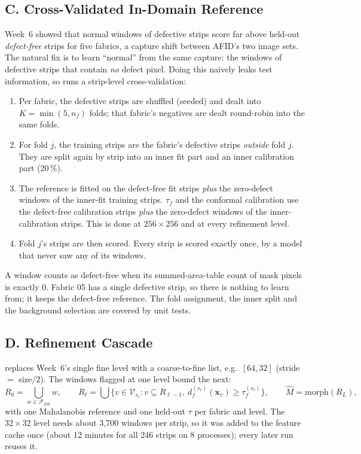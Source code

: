 \documentclass[11pt,a4paper]{article}
\newcommand{\code}[1]{\texttt{\detokenize{#1}}}
\begin{document}
\subsection*{C. Cross-Validated In-Domain Reference}

Week~6 showed that normal windows of defective strips score far above held-out \emph{defect-free} strips for five fabrics, a capture shift between AFID's two image sets. The natural fix is to learn ``normal'' from the same capture: the windows of defective strips that contain \emph{no} defect pixel. Doing this naively leaks test information, so \code{model.reference = "in_domain"} runs a strip-level cross-validation:
\begin{enumerate}
  \item Per fabric, the defective strips are shuffled (seeded) and dealt into $K=\min(5,n_f)$ folds; that fabric's negatives are dealt round-robin into the same folds.
  \item For fold $j$, the training strips are the fabric's defective strips \emph{outside} fold $j$. They are split again by strip into an inner fit part and an inner calibration part (20\,\%).
  \item The reference is fitted on the defect-free fit strips \emph{plus} the zero-defect windows of the inner-fit training strips. $\tau_f$ and the conformal calibration use the defect-free calibration strips \emph{plus} the zero-defect windows of the inner-calibration strips. This is done at $256\times256$ and at every refinement level.
  \item Fold $j$'s strips are then scored. Every strip is scored exactly once, by a model that never saw any of its windows.
\end{enumerate}
A window counts as defect-free when its summed-area-table count of mask pixels is exactly 0. Fabric 05 has a single defective strip, so there is nothing to learn from; it keeps the defect-free reference. The fold assignment, the inner split and the background selection are covered by unit tests.

\subsection*{D. Refinement Cascade}

\code{refine.sizes} replaces Week~6's single fine level with a coarse-to-fine list, e.g.\ $[64,32]$ (stride $=$ size$/2$). The windows flagged at one level bound the next:
\begin{equation}
R_0=\bigcup_{w\in\mathcal{F}_{256}}w,\qquad
R_{\ell}=\bigcup\big\{v\in\mathcal{V}_{s_\ell}: v\subseteq R_{\ell-1},\ d^{(s_\ell)}_f(\mathbf{x}_v)\ge\tau^{(s_\ell)}_f\big\},\qquad \hat M=\mathrm{morph}(R_L),
\label{eq:cascade}
\end{equation}
with one Mahalanobis reference and one held-out $\tau$ per fabric and level. The $32\times32$ level needs about 3{,}700 windows per strip, so it was added to the feature cache once (about 12 minutes for all 246 strips on 8 processes); every later run reuses it.
\end{document}
